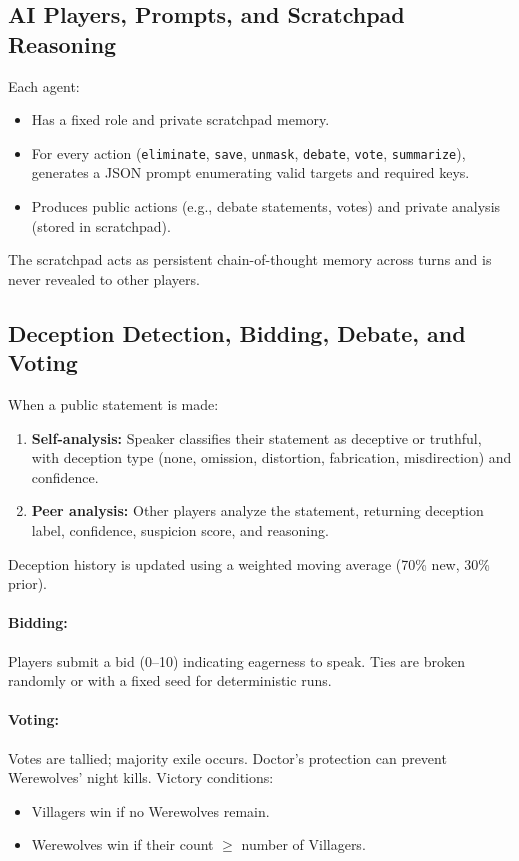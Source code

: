 \documentclass[12pt]{article}
\begin{document}
\subsection{AI Players, Prompts, and Scratchpad Reasoning}
Each agent:
\begin{itemize}
    \item Has a fixed role and private scratchpad memory.
    \item For every action (\texttt{eliminate}, \texttt{save}, \texttt{unmask}, \texttt{debate}, \texttt{vote}, \texttt{summarize}), generates a JSON prompt enumerating valid targets and required keys.
    \item Produces public actions (e.g., debate statements, votes) and private analysis (stored in scratchpad).
\end{itemize}
The scratchpad acts as persistent chain-of-thought memory across turns and is never revealed to other players.

\subsection{Deception Detection, Bidding, Debate, and Voting}
When a public statement is made:
\begin{enumerate}
    \item \textbf{Self-analysis:} Speaker classifies their statement as deceptive or truthful, with deception type (none, omission, distortion, fabrication, misdirection) and confidence.
    \item \textbf{Peer analysis:} Other players analyze the statement, returning deception label, confidence, suspicion score, and reasoning.
\end{enumerate}

Deception history is updated using a weighted moving average (70\% new, 30\% prior).

\paragraph{Bidding:}
Players submit a bid (0–10) indicating eagerness to speak. Ties are broken randomly or with a fixed seed for deterministic runs.

\paragraph{Voting:}
Votes are tallied; majority exile occurs. Doctor’s protection can prevent Werewolves’ night kills. Victory conditions:
\begin{itemize}
    \item Villagers win if no Werewolves remain.
    \item Werewolves win if their count $\geq$ number of Villagers.
\end{itemize}
\end{document}
